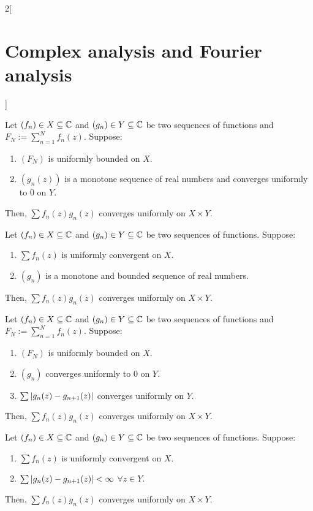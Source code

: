 \documentclass[../../../main.tex]{subfiles}
\begin{document}
\begin{multicols}{2}[\section{Complex analysis and Fourier analysis}]
\begin{theorem}
  \end{theorem}
  \begin{theorem}
    Let $(f_n)\in X\subseteq \mathbb{C}$ and $(g_n)\in Y\subseteq \mathbb{C}$ be two sequences of functions and $F_N:=\sum_{n=1}^Nf_n(z)$. Suppose:
    \begin{enumerate}
      \item $(F_N)$ is uniformly bounded on $X$.
      \item $(g_n(z))$ is a monotone sequence of real numbers and converges uniformly to 0 on $Y$.
    \end{enumerate}
    Then, $\sum f_n(z)g_n(z)$ converges uniformly on $X\times Y$.
  \end{theorem}
  \begin{theorem}
    Let $(f_n)\in X\subseteq \mathbb{C}$ and $(g_n)\in Y\subseteq \mathbb{C}$ be two sequences of functions. Suppose:
    \begin{enumerate}
      \item $\sum f_n(z)$ is uniformly convergent on $X$.
      \item $(g_n)$ is a monotone and bounded sequence of real numbers.
    \end{enumerate}
    Then, $\sum f_n(z)g_n(z)$ converges uniformly on $X\times Y$.
  \end{theorem}
  \begin{theorem}
    Let $(f_n)\in X\subseteq \mathbb{C}$ and $(g_n)\in Y\subseteq \mathbb{C}$ be two sequences of functions and $F_N:=\sum_{n=1}^Nf_n(z)$. Suppose:
    \begin{enumerate}
      \item $(F_N)$ is uniformly bounded on $X$.
      \item $(g_n)$ converges uniformly to 0 on $Y$.
      \item $\sum\abs{g_n(z)-g_{n+1}(z)}$ converges uniformly on $Y$.
    \end{enumerate}
    Then, $\sum f_n(z)g_n(z)$ converges uniformly on $X\times Y$.
  \end{theorem}
  \begin{theorem}
    Let $(f_n)\in X\subseteq \mathbb{C}$ and $(g_n)\in Y\subseteq \mathbb{C}$ be two sequences of functions. Suppose:
    \begin{enumerate}
      \item $\sum f_n(z)$ is uniformly convergent on $X$.
      \item $\sum\abs{g_n(z)-g_{n+1}(z)}<\infty$ $\forall z\in Y$.
    \end{enumerate}
    Then, $\sum f_n(z)g_n(z)$ converges uniformly on $X\times Y$.
  \end{theorem}

\end{multicols}
\end{document}
